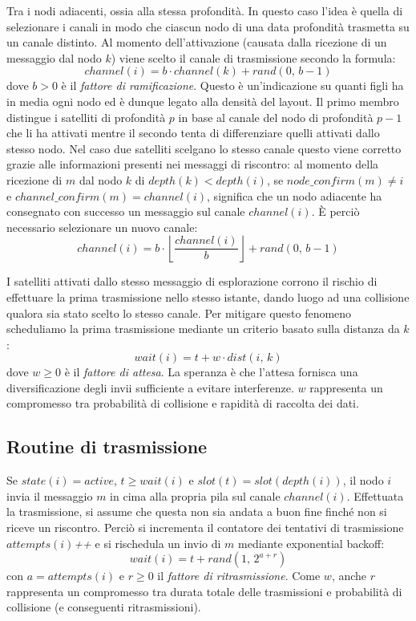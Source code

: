 \documentclass[a4paper,11pt]{article}
\theoremstyle{definition}
\begin{document}
Tra i nodi adiacenti, ossia alla stessa profondità. In questo caso l'idea è quella di selezionare i canali in modo che ciascun nodo di una data profondità trasmetta su un canale distinto. Al momento dell'attivazione (causata dalla ricezione di un messaggio dal nodo $k$) viene scelto il canale di trasmissione secondo la formula:
\begin{equation*}
channel(i) = b \cdot channel(k) + rand(0,\,b-1)
\end{equation*}
dove $b > 0$ è il \emph{fattore di ramificazione}. Questo è un'indicazione su quanti figli ha in media ogni nodo ed è dunque legato alla densità del layout. Il primo membro distingue i satelliti di profondità $p$ in base al canale del nodo di profondità $p-1$ che li ha attivati mentre il secondo tenta di differenziare quelli attivati dallo stesso nodo. Nel caso due satelliti scelgano lo stesso canale questo viene corretto grazie alle informazioni presenti nei messaggi di riscontro: al momento della ricezione di $m$ dal nodo $k$ di $depth(k) < depth(i)$, se $node\_confirm(m) \neq i$ e $channel\_confirm(m) = channel(i)$, significa che un nodo adiacente ha consegnato con successo un messaggio sul canale $channel(i)$. È perciò necessario selezionare un nuovo canale:
\begin{equation*}
channel(i) = b \cdot \left\lfloor\frac{channel(i)}{b}\right\rfloor + rand(0,\,b-1)
\end{equation*}

I satelliti attivati dallo stesso messaggio di esplorazione corrono il rischio di effettuare la prima trasmissione nello stesso istante, dando luogo ad una collisione qualora sia stato scelto lo stesso canale. Per mitigare questo fenomeno scheduliamo la prima trasmissione mediante un criterio basato sulla distanza da $k$:
\begin{equation*}
wait(i) = t + w \cdot dist(i,\,k)
\end{equation*}
dove $w \geq 0$ è il \emph{fattore di attesa}. La speranza è che l'attesa fornisca una diversificazione degli invii sufficiente a evitare interferenze. $w$ rappresenta un compromesso tra probabilità di collisione e rapidità di raccolta dei dati.

\subsection{Routine di trasmissione}

Se $state(i) = active$, $t \geq wait(i)$ e $slot(t) = slot(depth(i))$, il nodo $i$ invia il messaggio $m$ in cima alla propria pila sul canale $channel(i)$. Effettuata la trasmissione, si assume che questa non sia andata a buon fine finché non si riceve un riscontro. Perciò si incrementa il contatore dei tentativi di trasmissione $attempts(i)$\textit{++} e si rischedula un invio di $m$ mediante exponential backoff:
\begin{equation*}
wait(i) = t + rand(1,\,2^{a+r})
\end{equation*}
con $a = attempts(i)$ e $r \geq 0$ il \emph{fattore di ritrasmissione}. Come $w$, anche $r$ rappresenta un compromesso tra durata totale delle trasmissioni e probabilità di collisione (e conseguenti ritrasmissioni).
\end{document}
